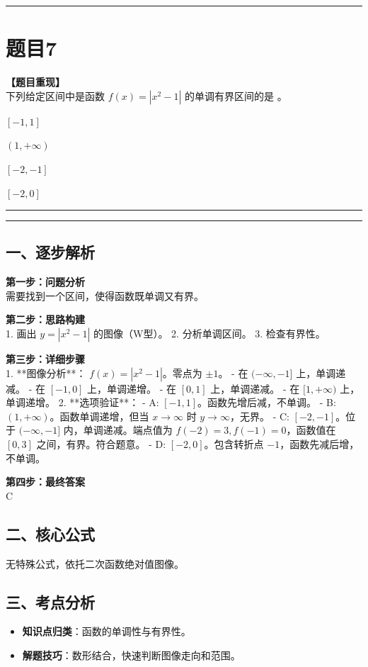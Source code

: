 \documentclass[12pt, a4paper]{ctexart}
\newcommand{\TopSeparator}{
    \par\noindent\rule{\textwidth}{1.5pt}\vspace{0.5em} %
}
\newcommand{\AnalysisSeparator}{
    \par\noindent\rule{\textwidth}{0.5pt}\vspace{0.2em}\hrule\vspace{0.5em} %
}
\newenvironment{RedAnalysis}{
    \par
    \color{red} %
}{
    \par
    \color{black} %
}
\newcommand{\choicesFour}[4]{
    \begin{enumerate}[label=\Alph*., itemsep=0pt, parsep=0pt, topsep=5pt, labelsep=0.5em]
        \begin{minipage}{0.22\linewidth} \item #1 \end{minipage}
        \begin{minipage}{0.22\linewidth} \item #2 \end{minipage}
        \begin{minipage}{0.22\linewidth} \item #3 \end{minipage}
        \begin{minipage}{0.22\linewidth} \item #4 \end{minipage}
    \end{enumerate}
}
\begin{document}
\TopSeparator
\section*{题目7}

\textbf{【题目重现】} \\
下列给定区间中是函数 $ f(x)=|x^{2}-1| $ 的单调有界区间的是 \underline{\hspace{1cm}}。
\choicesFour{$ [-1,1] $}{$ (1,+\infty) $}{$ [-2,-1] $}{$ [-2,0] $}

\AnalysisSeparator

\begin{RedAnalysis}

\subsection*{一、逐步解析}

\textbf{第一步：问题分析} \\
需要找到一个区间，使得函数既单调又有界。

\textbf{第二步：思路构建} \\
1. 画出 $y=|x^2-1|$ 的图像（W型）。
2. 分析单调区间。
3. 检查有界性。

\textbf{第三步：详细步骤} \\
1. **图像分析**：
   $f(x) = |x^2-1|$。零点为 $\pm 1$。
   - 在 $(-\infty, -1]$ 上，单调递减。
   - 在 $[-1, 0]$ 上，单调递增。
   - 在 $[0, 1]$ 上，单调递减。
   - 在 $[1, +\infty)$ 上，单调递增。
2. **选项验证**：
   - A: $[-1, 1]$。函数先增后减，不单调。
   - B: $(1, +\infty)$。函数单调递增，但当 $x \to \infty$ 时 $y \to \infty$，无界。
   - C: $[-2, -1]$。位于 $(-\infty, -1]$ 内，单调递减。端点值为 $f(-2)=3, f(-1)=0$，函数值在 $[0, 3]$ 之间，有界。符合题意。
   - D: $[-2, 0]$。包含转折点 $-1$，函数先减后增，不单调。

\textbf{第四步：最终答案} \\
C

\subsection*{二、核心公式}
无特殊公式，依托二次函数绝对值图像。

\subsection*{三、考点分析}
\begin{itemize}
    \item \textbf{知识点归类}：函数的单调性与有界性。
    \item \textbf{解题技巧}：数形结合，快速判断图像走向和范围。
\end{itemize}

\end{RedAnalysis}
\end{document}

